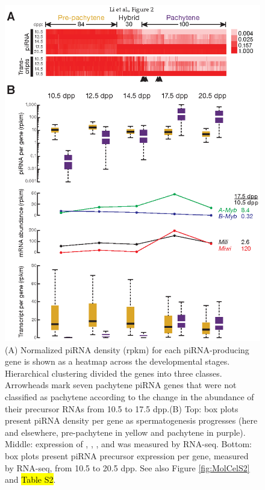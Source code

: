     \begin{figure}[htbp] %
      \centering 
      \includegraphics{Figures/MolCel/MolCel2013_Fig2.eps}
      \caption[Three Classes of piRNA-Generating Loci]
      {
        (A) Normalized piRNA density (rpkm) for each piRNA-producing gene is shown as a heatmap across the developmental stages. Hierarchical clustering divided the genes into three classes. Arrowheads mark seven pachytene piRNA genes that were not classified as pachytene according to the change in the abundance of their precursor RNAs from 10.5 to 17.5 dpp.(B) Top: box plots present piRNA density per gene as spermatogenesis progresses (here and elsewhere, pre-pachytene in yellow and pachytene in purple). Middle: expression of \amyb{}, \bmyb{}, \mili{}, and \miwi{} was measured by RNA-seq. Bottom: box plots present piRNA precursor expression per gene, measured by RNA-seq, from 10.5 to 20.5 dpp. See also Figure \ref{fig:MolCelS2}   and \hl{Table S2}.
        }
      \label{fig:MolCelF2}
      \end{figure}
